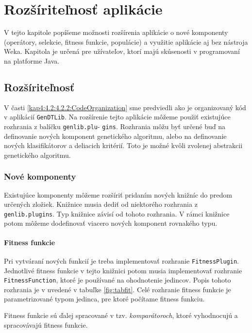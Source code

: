 \chapter{Rozšíriteľnosť aplikácie}\label{kapIII}
V tejto kapitole popíšeme možnosti rozšírenia aplikácie o nové komponenty (operátory, selekcie, fitness funkcie, populácie) a využitie aplikácie aj bez nástroja Weka. Kapitola je určená pre užívateľov, ktorí majú skúsenosti v programovaní na platforme Java.

\section{Rozšíriteľnosť}\label{kap4:4.4:Plugin}
V časti \ref{kap4:4.2:4.2.2:CodeOrganization} sme predviedli ako je organizovaný kód v aplikácií \verb|GenDTLib|.
Na rozšírenie tejto aplikácie môžeme použiť existujúce rozhrania z balíčku \verb|genlib.plu|- \verb|gins|. Rozhrania môžu byť určené buď na definovanie nových komponent genetického algoritmu, alebo na definovanie nových klasifikátorov a deliacich kritérií. Toto je možné kvôli zvolenej abstrakcii genetického algoritmu.
\subsection{Nové komponenty}
Existujúce komponenty môžeme rozšíriť pridaním nových knižníc do predom určených zložiek. Knižnice musia dediť od niektorého rozhrania z \verb|genlib.plugins|. Typ knižnice závisí od tohoto rozhrania. V rámci knižnice potom môžeme  dodefinovať viacero nových komponent rovnakého typu. 

\subsubsection*{Fitness funkcie}
Pri vytváraní nových funkcií je treba implementovať rozhranie \verb|FitnessPlugin|. Jednotlivé fitness funkcie v tejto knižnici potom musia implementovať rozhranie \verb|FitnessFunction|, ktoré je používané na ohodnotenie jedincov.
Popis tohoto rozhrania je v uvedené v tabuľke \ref{fig:tabfit}. Celé rozhranie fitness funkcie je parametrizované typom jedinca, pre ktoré počítame fitness funkciu.

Fitness funkcie sú ďalej spracované v tzv. \emph{komparátoroch}, ktoré vyhodnocujú a spracovávajú fitness funkcie.

